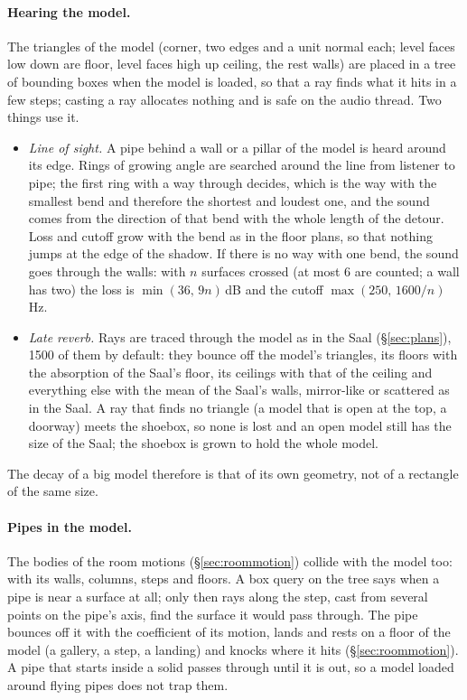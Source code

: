 \documentclass[11pt,a4paper,parskip=half,DIV=11,toc=bibliography]{scrartcl}
\begin{document}
\paragraph{Hearing the model.} The triangles of the model (corner, two edges and a unit normal each; level faces low down are
floor, level faces high up ceiling, the rest walls) are placed in a tree of bounding boxes when the model is loaded, so that a ray finds
what it hits in a few steps; casting a ray allocates nothing and is safe on the audio thread. Two things use it.
\begin{itemize}
  \item \emph{Line of sight.} A pipe behind a wall or a pillar of the model is heard around its edge. Rings of growing angle are
        searched around the line from listener to pipe; the first ring with a way through decides, which is the way with the
        smallest bend and therefore the shortest and loudest one, and the sound comes from the direction of that bend with
        the whole length of the detour. Loss and cutoff grow with the bend as in the floor plans, so that nothing jumps at the edge of
        the shadow. If there is no way with one bend, the sound goes through the walls: with $n$ surfaces crossed
        (at most 6 are counted; a wall has two) the loss is $\min(36,\,9n)$\,dB and the cutoff $\max(250,\,1600/n)$\,Hz.
  \item \emph{Late reverb.} Rays are traced through the model as in the Saal (\S\ref{sec:plans}), 1500 of them by default: they bounce
        off the model's triangles, its floors with the absorption of the Saal's floor, its ceilings with that of the ceiling and everything else
        with the mean of the Saal's walls, mirror-like or scattered as in the Saal. A ray that finds no triangle (a model that is open at the top,
        a doorway) meets the shoebox, so none is lost and an open model still has the size of the Saal; the shoebox is grown to hold the
        whole model.
\end{itemize}
The decay of a big model therefore is that of its own geometry, not of a rectangle of the same size.

\paragraph{Pipes in the model.} The bodies of the room motions (\S\ref{sec:roommotion}) collide with the model too: with its walls, columns,
steps and floors. A box query on the tree says when a pipe is near a surface at all; only then rays along the step, cast from several points on
the pipe's axis, find the surface it would pass through. The pipe bounces off it with the coefficient of its motion, lands and rests on a floor
of the model (a gallery, a step, a landing) and knocks where it hits (\S\ref{sec:roommotion}). A pipe that starts inside a solid passes through until
it is out, so a model loaded around flying pipes does not trap them.
\end{document}
